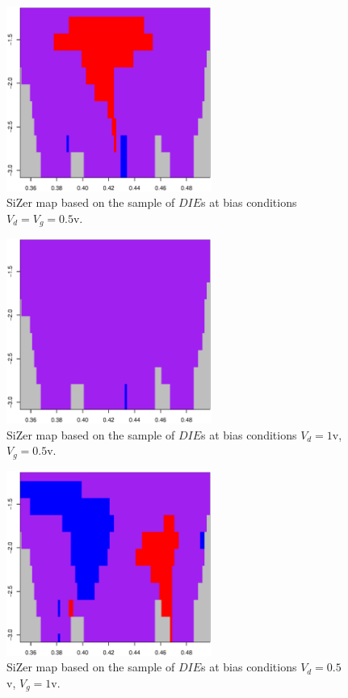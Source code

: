 \documentclass[sn-mathphys]{sn-jnl}%
\theoremstyle{thmstyleone}%
\theoremstyle{thmstyletwo}%
\theoremstyle{thmstylethree}%
\begin{document}
\begin{figure}[ht]
	\centerline{\includegraphics [width=0.6\textwidth]{Fig13_sizerd05g05.eps}}%
	\caption{SiZer map based on the sample of $DIE$s at bias conditions $V_d=V_g=0.5$v. }
	\label{fig:sizer1}
\end{figure}
\begin{figure}[ht]
	\centerline{\includegraphics [width=0.6\textwidth]{Fig14_sizerd1g05.eps}}%
	\caption{SiZer map based on the sample of $DIE$s at bias conditions $V_d=1$v, $V_g=0.5$v.}
	\label{fig:sizer2}
\end{figure}
\begin{figure}[ht]
	\centerline{\includegraphics [width=0.6\textwidth]{Fig15_sizerd05g1.eps}}%
	\caption{SiZer map based on the sample of $DIE$s at bias conditions $V_d=0.5$v, $V_g=1$v.}
	\label{fig:sizer3}
\end{figure}
\end{document}
